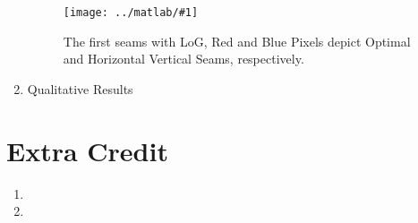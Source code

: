 \documentclass{article}
\newcommand{\listFigure}[3]{
	\begin{figure}[H]
		\texttt{[image: ../matlab/\#1]}
		\caption{#2\label{fig:#3}}
	\end{figure}		
}
\begin{document}
\begin{enumerate}
    \listFigure{seams-2.png}{The first seams with LoG, Red and Blue Pixels
    depict Optimal and Horizontal Vertical Seams, respectively.}{seams2}
	\item Qualitative Results
	
\end{enumerate}
\pagebreak

\label{Extra Credit}
\section{Extra Credit}
\begin{enumerate}
	\item
	\item 
\end{enumerate}
\end{document}
